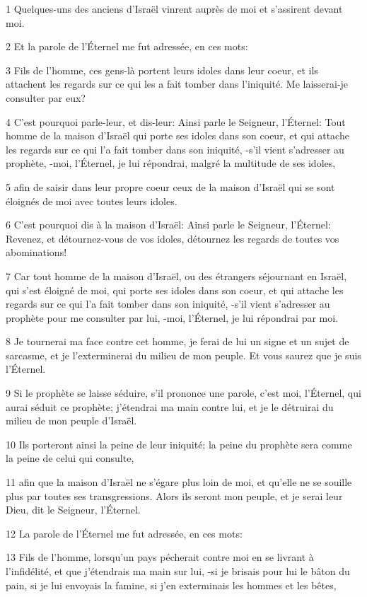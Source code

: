 \par 1 Quelques-uns des anciens d'Israël vinrent auprès de moi et s'assirent devant moi.
\par 2 Et la parole de l'Éternel me fut adressée, en ces mots:
\par 3 Fils de l'homme, ces gens-là portent leurs idoles dans leur coeur, et ils attachent les regards sur ce qui les a fait tomber dans l'iniquité. Me laisserai-je consulter par eux?
\par 4 C'est pourquoi parle-leur, et dis-leur: Ainsi parle le Seigneur, l'Éternel: Tout homme de la maison d'Israël qui porte ses idoles dans son coeur, et qui attache les regards sur ce qui l'a fait tomber dans son iniquité, -s'il vient s'adresser au prophète, -moi, l'Éternel, je lui répondrai, malgré la multitude de ses idoles,
\par 5 afin de saisir dans leur propre coeur ceux de la maison d'Israël qui se sont éloignés de moi avec toutes leurs idoles.
\par 6 C'est pourquoi dis à la maison d'Israël: Ainsi parle le Seigneur, l'Éternel: Revenez, et détournez-vous de vos idoles, détournez les regards de toutes vos abominations!
\par 7 Car tout homme de la maison d'Israël, ou des étrangers séjournant en Israël, qui s'est éloigné de moi, qui porte ses idoles dans son coeur, et qui attache les regards sur ce qui l'a fait tomber dans son iniquité, -s'il vient s'adresser au prophète pour me consulter par lui, -moi, l'Éternel, je lui répondrai par moi.
\par 8 Je tournerai ma face contre cet homme, je ferai de lui un signe et un sujet de sarcasme, et je l'exterminerai du milieu de mon peuple. Et vous saurez que je suis l'Éternel.
\par 9 Si le prophète se laisse séduire, s'il prononce une parole, c'est moi, l'Éternel, qui aurai séduit ce prophète; j'étendrai ma main contre lui, et je le détruirai du milieu de mon peuple d'Israël.
\par 10 Ils porteront ainsi la peine de leur iniquité; la peine du prophète sera comme la peine de celui qui consulte,
\par 11 afin que la maison d'Israël ne s'égare plus loin de moi, et qu'elle ne se souille plus par toutes ses transgressions. Alors ils seront mon peuple, et je serai leur Dieu, dit le Seigneur, l'Éternel.
\par 12 La parole de l'Éternel me fut adressée, en ces mots:
\par 13 Fils de l'homme, lorsqu'un pays pécherait contre moi en se livrant à l'infidélité, et que j'étendrais ma main sur lui, -si je brisais pour lui le bâton du pain, si je lui envoyais la famine, si j'en exterminais les hommes et les bêtes,
